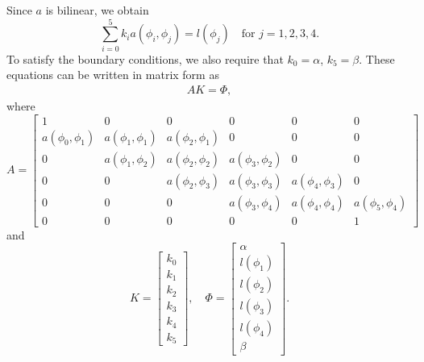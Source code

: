 Since $a$ is bilinear, we obtain 
\[
\sum_{i=0}^5 k_i  a ( \phi_i,\phi_j ) = l(\phi_j) \quad \text{for } j = 1,2,3,4.
\]
To satisfy the boundary conditions, we also require that $k_0 = \alpha$, $k_5 = \beta$.
These equations can be written in matrix form as 
\begin{align} AK = \Phi,\label{FE:linear_system}\end{align}
where 
\[
A = \left[\begin{array}{cccccc}1 & 0 & 0 & 0 & 0 & 0 \\a(\phi_0,\phi_1) & a(\phi_1,\phi_1) & a(\phi_2,\phi_1) & 0 & 0 & 0 \\0 & a(\phi_1,\phi_2) & a(\phi_2,\phi_2) & a(\phi_3,\phi_2) & 0 & 0 \\0 & 0 & a(\phi_2,\phi_3) & a(\phi_3,\phi_3) & a(\phi_4,\phi_3) & 0 \\0 & 0 & 0 & a(\phi_3,\phi_4) & a(\phi_4,\phi_4) & a(\phi_5,\phi_4) \\0 & 0 & 0 & 0 & 0 &1\end{array}\right]
\]
and
\[
K = \left[\begin{array}{c}k_0 \\k_1 \\k_2 \\k_3 \\k_4 \\k_5\end{array}\right] , \quad\Phi =  \left[\begin{array}{c}\alpha \\l(\phi_1) \\l(\phi_2) \\l(\phi_3) \\l(\phi_4) \\\beta\end{array}\right] .
\]

